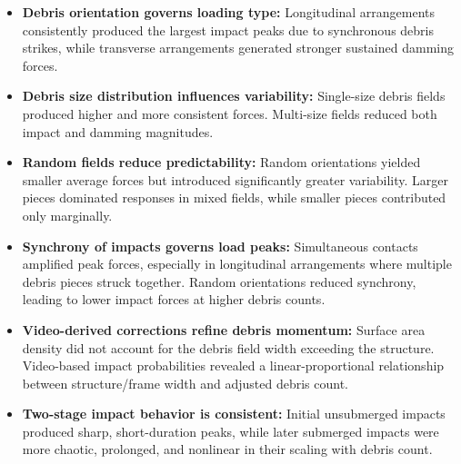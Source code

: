 \documentclass{article}
\begin{document}
\begin{itemize}
    \item \textbf{Debris orientation governs loading type:} Longitudinal arrangements consistently produced the largest impact peaks due to synchronous debris strikes, while transverse arrangements generated stronger sustained damming forces.
    
    \item \textbf{Debris size distribution influences variability:} Single-size debris fields produced higher and more consistent forces. Multi-size fields reduced both impact and damming magnitudes.
    
    \item \textbf{Random fields reduce predictability:} Random orientations yielded smaller average forces but introduced significantly greater variability. Larger pieces dominated responses in mixed fields, while smaller pieces contributed only marginally.
   
    \item \textbf{Synchrony of impacts governs load peaks:} Simultaneous contacts amplified peak forces, especially in longitudinal arrangements where multiple debris pieces struck together. Random orientations reduced synchrony, leading to lower impact forces at higher debris counts.
    
    \item \textbf{Video-derived corrections refine debris momentum:} Surface area density did not account for the debris field width exceeding the structure. Video-based impact probabilities revealed a linear-proportional relationship between structure/frame width and adjusted debris count. 


    \item \textbf{Two-stage impact behavior is consistent:} Initial unsubmerged impacts produced sharp, short-duration peaks, while later submerged impacts were more chaotic, prolonged, and nonlinear in their scaling with debris count.
\end{itemize}
\end{document}
